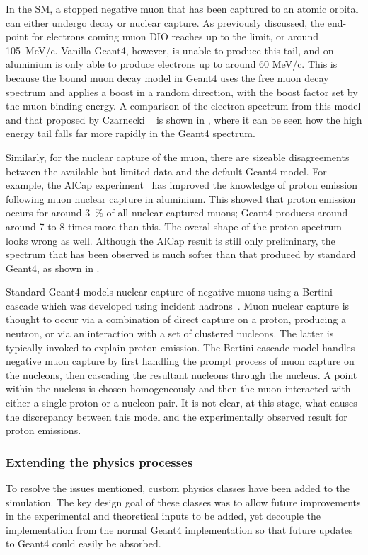 In the \ac{SM}, a stopped negative muon that has been captured to an atomic orbital can either undergo decay or nuclear capture.
As previously discussed, the end-point for electrons coming muon \ac{DIO} reaches up to the \mueconv limit, or around 105~MeV/c.  
Vanilla Geant4, however, is unable to produce this tail, and on aluminium is only able to produce electrons up to around 60 MeV/c.  
This is because the bound muon decay model in Geant4 uses the free muon decay spectrum and applies a boost in a random direction, with the boost factor set by the muon binding energy.
A comparison of the electron spectrum from this model and that proposed by Czarnecki \etal~\cite{Czarnecki2011} is shown in , where it can be seen how the high energy tail falls far more rapidly in the Geant4 spectrum.

Similarly, for the nuclear capture of the muon, there are sizeable disagreements between the available but limited data and the default Geant4 model.
For example, the AlCap experiment~\cite{AlcapProposal2012} has improved the knowledge of proton emission following muon nuclear capture in aluminium.
This showed that proton emission occurs for around 3~\% of all nuclear captured muons; Geant4 produces around around 7 to 8 times more than this.
The overal shape of the proton spectrum looks wrong as well.  
Although the AlCap result is still only preliminary, the spectrum that has been observed is much softer than that produced by standard Geant4, as shown in .

Standard Geant4 models nuclear capture of negative muons using a Bertini cascade which was developed using incident hadrons~\cite{Geant4:Bertini}.
Muon nuclear capture is thought to occur via a combination of direct capture on a proton, producing a neutron, or via an interaction with a set of clustered nucleons.
The latter is typically invoked to explain proton emission.
The Bertini cascade model handles negative muon capture by first handling the prompt process of muon capture on the nucleons, then cascading the resultant nucleons through the nucleus.
A point within the nucleus is chosen homogeneously and then the muon interacted with either a single proton or a nucleon pair.
It is not clear, at this stage, what causes the discrepancy between this model and the experimentally observed result for proton emissions.

\subsubsection{Extending the physics processes}
To resolve the issues mentioned, custom physics classes have been added to the \COMET simulation.
The key design goal of these classes was to allow future improvements in the experimental and theoretical inputs to be added, yet decouple the implementation from the normal Geant4 implementation so that future updates to Geant4 could easily be absorbed.


